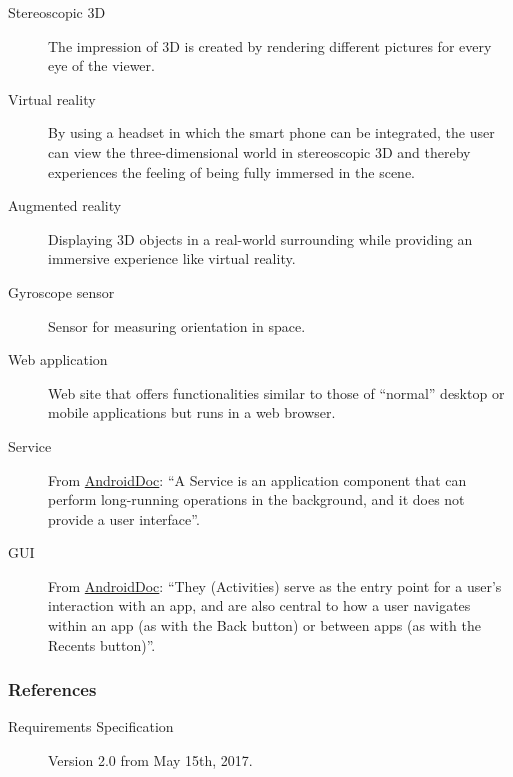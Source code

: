 \begin{description}
	\item[Stereoscopic 3D] The impression of 3D is created by rendering different pictures for every eye of the viewer.
	\item[Virtual reality] By using a headset in which the smart phone can be integrated, the user can view the three-dimensional world in stereoscopic 3D and thereby experiences the feeling of being fully immersed in the scene.
	\item[Augmented reality] Displaying 3D objects in a real-world surrounding while providing an immersive experience like virtual reality.
	\item[Gyroscope sensor] Sensor for measuring orientation in space.
	\item[Web application] Web site that offers functionalities similar to those of ``normal'' desktop or mobile applications but runs in a web browser.
	\item[Service] From \href{https://developer.android.com/guide/components/services.html}{AndroidDoc}: ``A Service is an application component that can perform long-running operations in the background, and it does not provide a user interface''.
	\item[GUI] From \href{https://developer.android.com/guide/components/activities.html}{AndroidDoc}: ``They (Activities) serve as the entry point for a user's interaction with an app, and are also central to how a user navigates within an app (as with the Back button) or between apps (as with the Recents button)''.
\end{description}


\subsubsection{References}

\begin{description}
	\item[Requirements Specification] Version 2.0 from May 15th, 2017.
\end{description}
